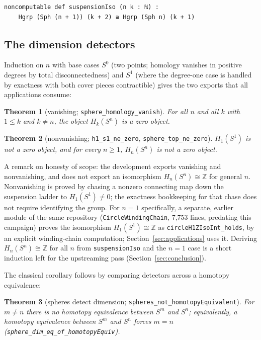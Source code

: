 \documentclass[11pt]{article}
\newtheorem{theorem}{Theorem}[section]
\theoremstyle{remark}
\newcommand{\Z}{\mathbb{Z}}
\newcommand{\leanname}[1]{\texttt{#1}}
\begin{document}
\begin{lstlisting}
noncomputable def suspensionIso (n k : ℕ) :
    Hgrp (Sph (n + 1)) (k + 2) ≅ Hgrp (Sph n) (k + 1)
\end{lstlisting}

\subsection{The dimension detectors}

Induction on $n$ with base cases $S^0$ (two points; homology vanishes in
positive degrees by total disconnectedness) and $S^1$ (where the degree-one
case is handled by exactness with both cover pieces contractible) gives the
two exports that all applications consume:

\begin{theorem}[vanishing; \leanname{sphere\_homology\_vanish}]
\label{thm:vanish}
For all $n$ and all $k$ with $1 \le k$ and $k \ne n$, the object
$H_k(S^n)$ is a zero object.
\end{theorem}

\begin{theorem}[nonvanishing; \leanname{h1\_s1\_ne\_zero},
\leanname{sphere\_top\_ne\_zero}]\label{thm:nonvanish}
$H_1(S^1)$ is not a zero object, and for every $n \ge 1$, $H_n(S^n)$ is
not a zero object.
\end{theorem}

A remark on honesty of scope: the development exports vanishing and
nonvanishing, and does not export an isomorphism $H_n(S^n) \cong \Z$ for
general $n$. Nonvanishing is proved by chasing a nonzero connecting map down
the suspension ladder to $H_1(S^1) \ne 0$; the exactness bookkeeping for
that chase does not require identifying the group. For $n = 1$ specifically,
a separate, earlier module of the same repository
(\leanname{CircleWindingChain}, 7{,}753 lines, predating this campaign)
proves the isomorphism
$H_1(S^1) \cong \Z$ as \leanname{circleH1ZIsoInt\_holds}, by an explicit
winding-chain computation; Section~\ref{sec:applications} uses it. Deriving
$H_n(S^n) \cong \Z$ for all $n$ from \leanname{suspensionIso} and the
$n = 1$ case is a short induction left for the upstreaming pass
(Section~\ref{sec:conclusion}).

The classical corollary follows by comparing detectors across a homotopy
equivalence:

\begin{theorem}[spheres detect dimension;
\leanname{spheres\_not\_homotopyEquivalent}]\label{thm:spheres-detect}
For $m \ne n$ there is no homotopy equivalence between $S^m$ and $S^n$;
equivalently, a homotopy equivalence between $S^m$ and $S^n$ forces
$m = n$ (\leanname{sphere\_dim\_eq\_of\_homotopyEquiv}).
\end{theorem}
\end{document}
